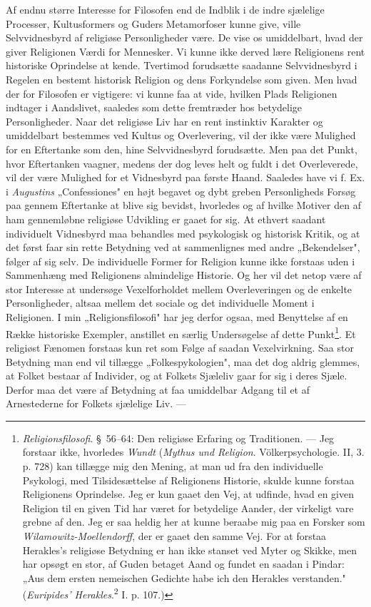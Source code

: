 \documentclass[12pt,a4paper]{book}
\newcommand{\apage}[1]{\marginnote{\footnotesize\textit{[#1]}}}
\begin{document}
Af endnu større Interesse for Filosofen
end de Indblik i de indre sjælelige Processer, Kultusformers og Guders Metamorfoser kunne
give, ville Selvvidnesbyrd af religiøse Personligheder være. De vise os umiddelbart, hvad der
giver \apage{391} Religionen Værdi for Mennesker. Vi kunne ikke derved lære Religionens rent historiske
Oprindelse at kende. Tvertimod forudsætte saadanne Selvvidnesbyrd i Regelen en bestemt
historisk Religion og dens Forkyndelse som given. Men hvad der for Filosofen er vigtigere: vi
kunne faa at vide, hvilken Plads Religionen indtager i Aandslivet, saaledes som dette
fremtræder hos betydelige Personligheder. Naar det religiøse Liv har en rent instinktiv
Karakter og umiddelbart bestemmes ved Kultus og Overlevering, vil der ikke være Mulighed for
en Eftertanke som den, hine Selvvidnesbyrd forudsætte. Men paa det Punkt, hvor Eftertanken
vaagner, medens der dog leves helt og fuldt i det Overleverede, vil der være Mulighed for et
Vidnesbyrd paa første Haand. Saaledes have vi f. Ex. i \emph{Augustins} „Confessiones" en
højt begavet og dybt greben Personligheds Forsøg paa gennem Eftertanke at blive sig bevidst,
hvorledes og af hvilke Motiver den af ham gennemløbne religiøse Udvikling er gaaet for sig. At
ethvert saadant individuelt Vidnesbyrd maa behandles med psykologisk og historisk Kritik, og
at det først faar sin rette Betydning ved at sammenlignes med andre „Bekendelser", følger af
sig selv. De individuelle Former for Religion kunne ikke forstaas uden i Sammenhæng med
Religionens almindelige Historie. Og her vil det netop være af stor Interesse at undersøge
Vexelforholdet mellem Overleveringen og de enkelte Personligheder, altsaa mellem det sociale
og det individuelle Moment i Religionen. I min „Religionsfilosofi" har jeg derfor ogsaa, med
Benyttelse af en Række historiske Exempler, anstillet en særlig Undersøgelse af dette
Punkt\footnote{\emph{Religionsfilosofi}. \S\ 56--64: Den religiøse Erfaring og Traditionen.
--- Jeg forstaar ikke, hvorledes \emph{Wundt} (\emph{Mythus und Religion}. Völkerpsychologie.
II, 3. p. 728) kan tillægge mig den Mening, at man ud fra den individuelle Psykologi, med
Tilsidesættelse af Religionens Historie, skulde kunne forstaa Religionens Oprindelse. Jeg er
kun gaaet den Vej, at udfinde, hvad en given Religion til en given Tid har været for
betydelige Aander, der virkeligt vare grebne af den. Jeg er saa heldig her at kunne beraabe
mig paa en Forsker som \emph{Wilamowitz-Moellendorff}, der er gaaet den samme Vej. For at
forstaa Herakles's religiøse Betydning er han ikke stanset ved Myter og Skikke, men har
opsøgt en stor, af Guden betaget Aand og fundet en saadan i Pindar: „Aus dem ersten
nemeischen Gedichte habe ich den Herakles verstanden." (\emph{Euripides' Herakles}.\textsuperscript{2}
I. p. 107.)}. Et religiøst Fænomen forstaas kun ret som Følge af saadan Vexelvirkning. Saa
stor \apage{392} Betydning man end vil tillægge „Folkespykologien", maa det dog aldrig glemmes, at Folket
bestaar af Individer, og at Folkets Sjæleliv gaar for sig i deres Sjæle. Derfor maa det være
af Betydning at faa umiddelbar Adgang til et af Arnestederne for Folkets sjælelige Liv. ---
\end{document}
